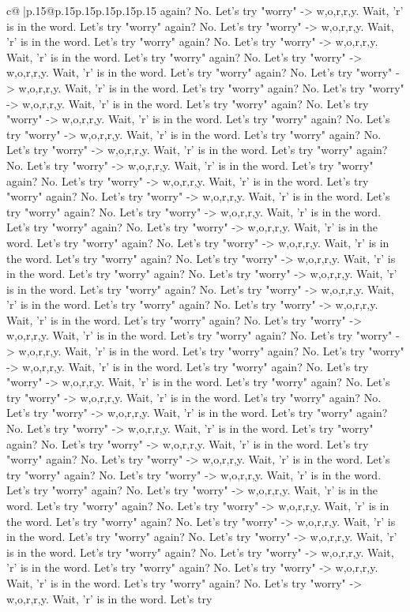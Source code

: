 \documentclass{article}
\begin{document}
{\begin{supertabular}{c@{$\;$}|p{.15\linewidth}@{}p{.15\linewidth}p{.15\linewidth}p{.15\linewidth}p{.15\linewidth}p{.15\linewidth}}
{{{again? No. Let's try "worry" {-}> w,o,r,r,y. Wait, 'r' is in the word. Let's try "worry" again? No. Let's try "worry" {-}> w,o,r,r,y. Wait, 'r' is in the word. Let's try "worry" again? No. Let's try "worry" {-}> w,o,r,r,y. Wait, 'r' is in the word. Let's try "worry" again? No. Let's try "worry" {-}> w,o,r,r,y. Wait, 'r' is in the word. Let's try "worry" again? No. Let's try "worry" {-}> w,o,r,r,y. Wait, 'r' is in the word. Let's try "worry" again? No. Let's try "worry" {-}> w,o,r,r,y. Wait, 'r' is in the word. Let's try "worry" again? No. Let's try "worry" {-}> w,o,r,r,y. Wait, 'r' is in the word. Let's try "worry" again? No. Let's try "worry" {-}> w,o,r,r,y. Wait, 'r' is in the word. Let's try "worry" again? No. Let's try "worry" {-}> w,o,r,r,y. Wait, 'r' is in the word. Let's try "worry" again? No. Let's try "worry" {-}> w,o,r,r,y. Wait, 'r' is in the word. Let's try "worry" again? No. Let's try "worry" {-}> w,o,r,r,y. Wait, 'r' is in the word. Let's try "worry" again? No. Let's try "worry" {-}> w,o,r,r,y. Wait, 'r' is in the word. Let's try "worry" again? No. Let's try "worry" {-}> w,o,r,r,y. Wait, 'r' is in the word. Let's try "worry" again? No. Let's try "worry" {-}> w,o,r,r,y. Wait, 'r' is in the word. Let's try "worry" again? No. Let's try "worry" {-}> w,o,r,r,y. Wait, 'r' is in the word. Let's try "worry" again? No. Let's try "worry" {-}> w,o,r,r,y. Wait, 'r' is in the word. Let's try "worry" again? No. Let's try "worry" {-}> w,o,r,r,y. Wait, 'r' is in the word. Let's try "worry" again? No. Let's try "worry" {-}> w,o,r,r,y. Wait, 'r' is in the word. Let's try "worry" again? No. Let's try "worry" {-}> w,o,r,r,y. Wait, 'r' is in the word. Let's try "worry" again? No. Let's try "worry" {-}> w,o,r,r,y. Wait, 'r' is in the word. Let's try "worry" again? No. Let's try "worry" {-}> w,o,r,r,y. Wait, 'r' is in the word. Let's try "worry" again? No. Let's try "worry" {-}> w,o,r,r,y. Wait, 'r' is in the word. Let's try "worry" again? No. Let's try "worry" {-}> w,o,r,r,y. Wait, 'r' is in the word. Let's try "worry" again? No. Let's try "worry" {-}> w,o,r,r,y. Wait, 'r' is in the word. Let's try "worry" again? No. Let's try "worry" {-}> w,o,r,r,y. Wait, 'r' is in the word. Let's try "worry" again? No. Let's try "worry" {-}> w,o,r,r,y. Wait, 'r' is in the word. Let's try "worry" again? No. Let's try "worry" {-}> w,o,r,r,y. Wait, 'r' is in the word. Let's try "worry" again? No. Let's try "worry" {-}> w,o,r,r,y. Wait, 'r' is in the word. Let's try "worry" again? No. Let's try "worry" {-}> w,o,r,r,y. Wait, 'r' is in the word. Let's try "worry" again? No. Let's try "worry" {-}> w,o,r,r,y. Wait, 'r' is in the word. Let's try "worry" again? No. Let's try "worry" {-}> w,o,r,r,y. Wait, 'r' is in the word. Let's try "worry" again? No. Let's try "worry" {-}> w,o,r,r,y. Wait, 'r' is in the word. Let's try "worry" again? No. Let's try "worry" {-}> w,o,r,r,y. Wait, 'r' is in the word. Let's try "worry" again? No. Let's try "worry" {-}> w,o,r,r,y. Wait, 'r' is in the word. Let's try "worry" again? No. Let's try "worry" {-}> w,o,r,r,y. Wait, 'r' is in the word. Let's try "worry" again? No. Let's try "worry" {-}> w,o,r,r,y. Wait, 'r' is in the word. Let's try }}}
\end{supertabular}}
\end{document}
